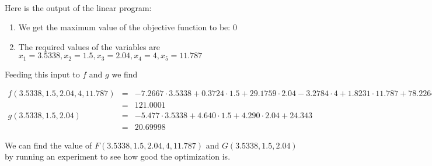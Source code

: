 \documentclass[11pt]{article}
\begin{document}
\paragraph{}
Here is the output of the linear program:
\begin{enumerate}
\item We get the maximum value of the objective function to be: $0$
\item The required values of the variables are $x_1 = 3.5338,x_2 = 1.5,x_3 = 2.04, x_4 = 4, x_5 = 11.787$
\end{enumerate}
Feeding this input to $f$ and $g$ we find
\begin{tiny}
\begin{eqnarray*}
f(3.5338, 1.5, 2.04, 4, 11.787) &=& -7.2667 \cdot 3.5338 + 0.3724 \cdot 1.5 + 29.1759 \cdot 2.04 - 3.2784 \cdot 4 + 1.8231 \cdot 11.787 + 78.2264\\
&=& 121.0001\\
g(3.5338, 1.5, 2.04) &=& -5.477 \cdot 3.5338 + 4.640 \cdot 1.5 + 4.290  \cdot 2.04 + 24.343\\
&=& 20.69998
\end{eqnarray*}
\end{tiny}
We can find the value of $F(3.5338, 1.5, 2.04, 4, 11.787)$ and $G(3.5338, 1.5, 2.04)$ by running an experiment to see how good the optimization is.
\end{document}
